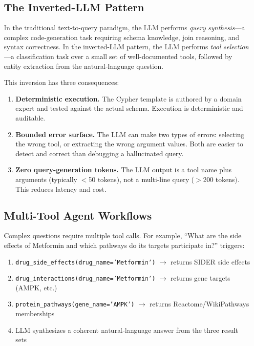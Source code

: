 \documentclass[sigconf]{acmart}
\begin{document}
\subsection{The Inverted-LLM Pattern}

In the traditional text-to-query paradigm, the LLM performs
\emph{query synthesis}---a complex code-generation task requiring
schema knowledge, join reasoning, and syntax correctness.
In the inverted-LLM pattern, the LLM performs \emph{tool
selection}---a classification task over a small set of
well-documented tools, followed by entity extraction
from the natural-language question.

This inversion has three consequences:

\begin{enumerate}
\item \textbf{Deterministic execution.}  The Cypher template is
  authored by a domain expert and tested against the actual schema.
  Execution is deterministic and auditable.
\item \textbf{Bounded error surface.}  The LLM can make two
  types of errors: selecting the wrong tool, or extracting the
  wrong argument values.  Both are easier to detect and correct
  than debugging a hallucinated query.
\item \textbf{Zero query-generation tokens.}  The LLM output is
  a tool name plus arguments (typically $<$50 tokens), not a
  multi-line query ($>$200 tokens).  This reduces latency and cost.
\end{enumerate}

\subsection{Multi-Tool Agent Workflows}

Complex questions require multiple tool calls.  For example,
``What are the side effects of Metformin and which pathways do
its targets participate in?'' triggers:

\begin{enumerate}
\item \texttt{drug\_side\_effects(drug\_name='Metformin')}
  $\to$ returns SIDER side effects
\item \texttt{drug\_interactions(drug\_name='Metformin')}
  $\to$ returns gene targets (AMPK, etc.)
\item \texttt{protein\_pathways(gene\_name='AMPK')}
  $\to$ returns Reactome/WikiPathways memberships
\item LLM synthesizes a coherent natural-language answer
  from the three result sets
\end{enumerate}
\end{document}
